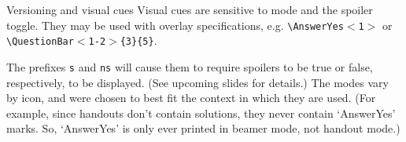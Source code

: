 \documentclass[10pt]{beamer}
\begin{document}
\begin{frame}{Versioning and visual cues}
Visual cues are sensitive to mode and the spoiler toggle. They may be used with overlay specifications, e.g. \texttt{\textbackslash AnswerYes$<$1$>$} or \texttt{\textbackslash QuestionBar$<$1-2$>$\{3\}\{5\}}.
\vfill

The prefixes \texttt{s} and \texttt{ns} will cause them to require spoilers to be true or false, respectively, to be displayed. (See upcoming slides for details.) The modes vary by icon, and were chosen to best fit the context in which they are used. (For example, since handouts don't contain solutions, they never contain `AnswerYes' marks. So, `AnswerYes' is only ever printed in beamer mode, not handout mode.)
\end{frame}
\end{document}
